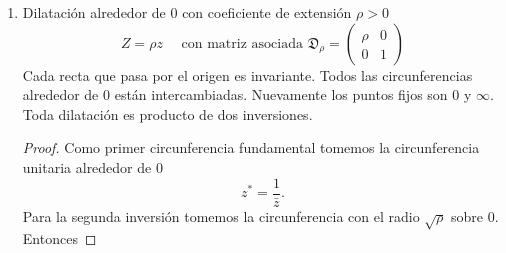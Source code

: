 \documentclass{matematicasud}
\begin{document}
\begin{enumerate}
\begin{figure}[ht]
\begin{center}
\begin{tikzpicture}
            \end{tikzpicture}
        \end{center}
        \caption{Rotación del punto $z$ al punto $Z=ze^{i\alpha}$}
        \label{fig:rotacion}
        \end{figure}
        \begin{proof}
            Como circunferencia fundamental para la primera inversión elegimos el eje real $iz-i\bar{z}=0$. Por esto $z^*=\bar{z}$. Como segunda circunferencia tomamos la línea a través de $0$ la cual hace el ángulo $\frac{1}{2}\alpha$ con el eje real
            \begin{equation*}
                ie^{-i(\alpha/2)}z-ie^{i(\alpha/2)}\bar{z}=0.
            \end{equation*}
            La segunda inversión toma $z^*$ en 
            \begin{align*}
                Z&=(e^{i(\alpha/2)}/e^{-i(\alpha/2)})\bar{z^*}\\
                &=\frac{e^{i(\alpha/2)}}{e^{-i(\alpha/2)}}\bar{z^*}\\
                &=e^{i(\alpha/2)}e^{i(\alpha/2)}\bar{\bar{z}}\\
                &=e^{i\alpha}z.
            \end{align*}
        \end{proof}
        \item Dilatación alrededor de $0$ con coeficiente de extensión $\rho>0$
        \begin{equation}
            Z=\rho z \quad \text{ con matriz asociada }\mathfrak{D}_\rho =
            \begin{pmatrix}
                \rho & 0\\
                0 & 1
            \end{pmatrix}
            \label{eq:(32)}
        \end{equation}
        Cada recta que pasa por el origen es invariante. Todos las circunferencias alrededor de $0$ están intercambiadas. Nuevamente los puntos fijos son $0$ y $\infty$. Toda dilatación es producto de dos inversiones.
        \begin{proof}
            Como primer circunferencia fundamental tomemos la circunferencia unitaria alrededor de $0$
            \begin{equation*}
                z^*=\frac{1}{\bar{z}}.
            \end{equation*}
            Para la segunda inversión tomemos la circunferencia con el radio $\sqrt{\rho}$ sobre $0$. Entonces

\end{proof}
\end{enumerate}
\end{document}
